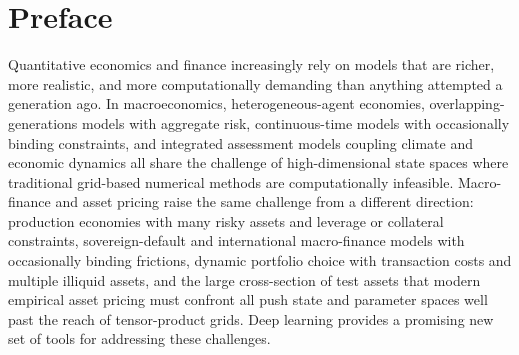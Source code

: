 \documentclass[11pt,a4paper]{report}
\begin{document}
\hypersetup{pageanchor=true}

\tableofcontents

\chapter*{Preface}

Quantitative economics and finance increasingly rely on models that are richer, more realistic, and more computationally demanding than anything attempted a generation ago.  In macroeconomics, heterogeneous-agent economies, overlapping-generations models with aggregate risk, continuous-time models with occasionally binding constraints, and integrated assessment models coupling climate and economic dynamics all share the challenge of high-dimensional state spaces where traditional grid-based numerical methods are computationally infeasible.  Macro-finance and asset pricing raise the same challenge from a different direction: production economies with many risky assets and leverage or collateral constraints, sovereign-default and international macro-finance models with occasionally binding frictions, dynamic portfolio choice with transaction costs and multiple illiquid assets, and the large cross-section of test assets that modern empirical asset pricing must confront all push state and parameter spaces well past the reach of tensor-product grids.  Deep learning provides a promising new set of tools for addressing these challenges.
\end{document}
